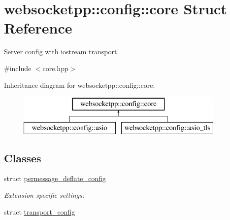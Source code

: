 \hypertarget{structwebsocketpp_1_1config_1_1core}{}\section{websocketpp\+:\+:config\+:\+:core Struct Reference}
\label{structwebsocketpp_1_1config_1_1core}


Server config with iostream transport.  




{\ttfamily \#include $<$core.\+hpp$>$}

Inheritance diagram for websocketpp\+:\+:config\+:\+:core\+:\begin{figure}[H]
\begin{center}
\leavevmode
\includegraphics[height=2.000000cm]{structwebsocketpp_1_1config_1_1core}
\end{center}
\end{figure}
\subsection*{Classes}
\begin{DoxyCompactItemize}
\item 
struct \hyperlink{structwebsocketpp_1_1config_1_1core_1_1permessage__deflate__config}{permessage\+\_\+deflate\+\_\+config}
\begin{DoxyCompactList}\small\item\em Extension specific settings\+: \end{DoxyCompactList}\item 
struct \hyperlink{structwebsocketpp_1_1config_1_1core_1_1transport__config}{transport\+\_\+config}
\end{DoxyCompactItemize}
